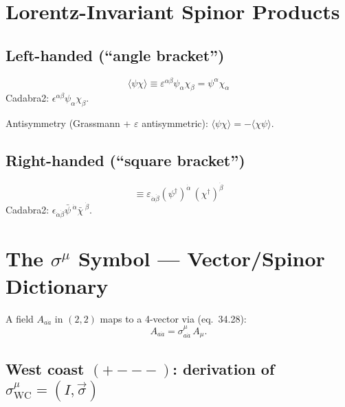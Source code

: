 \documentclass[12pt]{article}
\newcommand{\psidag}{\psi^{\dagger}}
\begin{document}
\section{Lorentz-Invariant Spinor Products}

\subsection{Left-handed (``angle bracket'')}
\begin{equation}
  \langle\psi\chi\rangle
  \equiv \varepsilon^{\alpha\beta}\psi_\alpha\chi_\beta
  = \psi^\alpha\chi_\alpha
  \tag{35.21 preview}
\end{equation}
Cadabra2: $\epsilon^{\alpha \beta} \psi_{\alpha} \chi_{\beta}$.

Antisymmetry (Grassmann + $\varepsilon$ antisymmetric):
$\langle\psi\chi\rangle = -\langle\chi\psi\rangle$.

\subsection{Right-handed (``square bracket'')}
\begin{equation}
  [\psidag\,\chi^{\dagger}]
  \equiv \varepsilon_{\dot{\alpha}\dot{\beta}}
         (\psidag)^{\dot{\alpha}}\,(\chi^{\dagger})^{\dot{\beta}}
\end{equation}
Cadabra2: $\epsilon_{\dot{\alpha} \dot{\beta}} \bar{\psi}\,^{\dot{\alpha}} \bar{\chi}\,^{\dot{\beta}}$.

\section{The \texorpdfstring{$\sigma^\mu$}{sigma\^mu} Symbol ---
         Vector/Spinor Dictionary}

A field $A_{a\dot{a}}$ in $(2,2)$ maps to a 4-vector via (eq.~34.28):
\begin{equation}
  A_{a\dot{a}} = \sigma^\mu_{a\dot{a}}\,A_\mu.
  \tag{34.28}
\end{equation}

\subsection{West coast \texorpdfstring{$(+{-}{-}{-})$}{(+---)}: derivation of
  \texorpdfstring{$\sigma^\mu_{\mathrm{WC}} = (I,\vec{\sigma})$}{sigma\^mu WC}}
\end{document}
